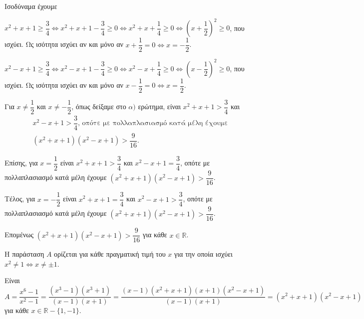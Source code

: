 
\begin{alist}
\item Ισοδύναμα έχουμε
\begin{rlist}
\item $x^2 + x + 1 \ge \dfrac{3}{4} \Leftrightarrow x^2 + x + 1 - \dfrac{3}{4} \ge 0 \Leftrightarrow x^2 + x + \dfrac{1}{4} \ge 0 \Leftrightarrow \left(x + \dfrac{1}{2}\right)^2 \ge 0$, που ισχύει.
Ως ισότητα ισχύει αν και μόνο αν $x + \dfrac{1}{2} = 0 \Leftrightarrow x = -\dfrac{1}{2}$.

\item $x^2 - x + 1 \ge \dfrac{3}{4} \Leftrightarrow x^2 - x + 1 - \dfrac{3}{4} \ge 0 \Leftrightarrow x^2 - x + \dfrac{1}{4} \ge 0 \Leftrightarrow \left(x - \dfrac{1}{2}\right)^2 \ge 0$, που ισχύει.
Ως ισότητα ισχύει αν και μόνο αν $x - \dfrac{1}{2} = 0 \Leftrightarrow x = \dfrac{1}{2}$.
\end{rlist}

\item Για $x \ne \dfrac{1}{2}$ και $x \ne -\dfrac{1}{2}$, όπως δείξαμε στο $\alpha)$ ερώτημα, είναι $x^2 + x + 1 > \dfrac{3}{4}$ και
\begin{gather*}
x^2 - x + 1 > \dfrac{3}{4}\text{, οπότε με πολλαπλασιασμό κατά μέλη έχουμε} \\
(x^2 + x + 1)(x^2 - x + 1) > \dfrac{9}{16}.
\end{gather*}

Επίσης, για $x = \dfrac{1}{2}$ είναι $x^2 + x + 1 > \dfrac{3}{4}$ και $x^2 - x + 1 = \dfrac{3}{4}$, οπότε με πολλαπλασιασμό
κατά μέλη έχουμε $(x^2 + x + 1)(x^2 - x + 1) > \dfrac{9}{16}$.

Τέλος, για $x = -\dfrac{1}{2}$ είναι $x^2 + x + 1 = \dfrac{3}{4}$ και $x^2 - x + 1 > \dfrac{3}{4}$, οπότε με πολλαπλασιασμό
κατά μέλη έχουμε $(x^2 + x + 1)(x^2 - x + 1) > \dfrac{9}{16}$.

Επομένως $(x^2 + x + 1)(x^2 - x + 1) > \dfrac{9}{16}$ για κάθε $x \in \mathbb{R}$.

\item 
\begin{rlist}
\item Η παράσταση $A$ ορίζεται για κάθε πραγματική τιμή του $x$ για την οποία
ισχύει $x^2 \ne 1 \Leftrightarrow x \ne \pm 1$.
\item Είναι
\[A = \dfrac{x^6 - 1}{x^2 - 1} = \dfrac{(x^3 - 1)(x^3 + 1)}{(x - 1)(x + 1)} = \dfrac{(x - 1)(x^2 + x + 1)(x + 1)(x^2 - x + 1)}{(x - 1)(x + 1)} = (x^2 + x + 1)(x^2 - x + 1)\]
για κάθε $x \in \mathbb{R} - \{1, -1\}$.


\end{rlist}
\end{alist}
